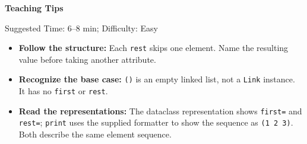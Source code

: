 \begin{questionmeta}
\textbf{Teaching Tips}\par\nopagebreak[4]
Suggested Time: 6--8 min; Difficulty: Easy
\nopagebreak[4]
\begin{itemize}
    \item \textbf{Follow the structure:} Each \lstinline{rest} skips one element. Name the resulting value before taking another attribute.
    \item \textbf{Recognize the base case:} \lstinline{()} is an empty linked list, not a \lstinline{Link} instance. It has no \lstinline{first} or \lstinline{rest}.
    \item \textbf{Read the representations:} The dataclass representation shows \lstinline{first=} and \lstinline{rest=}; \lstinline{print} uses the supplied formatter to show the sequence as \lstinline{(1 2 3)}. Both describe the same element sequence.
\end{itemize}
\end{questionmeta}
